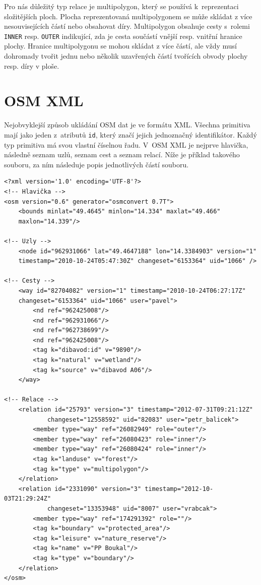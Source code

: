 Pro nás důležitý typ relace je {\tuc multipolygon}, který se používá k~reprezentaci
složitějších ploch. Plocha reprezentovaná multipolygonem se může skládat z více
nesouvisejících částí nebo obsahovat díry. Multipolygon obsahuje cesty s~rolemi 
\verb|INNER| resp. \verb|OUTER| indikující, zda je cesta součástí vnější resp.
vnitřní hranice plochy. Hranice multipolygonu se mohou skládat z více částí, ale
vždy musí dohromady tvořit jednu nebo několik uzavřených částí tvořících obvody 
plochy resp. díry v ploše.

\section{OSM XML}
Nejobvyklejší způsob ukládání OSM dat je ve formátu XML. Všechna primitiva mají
jako jeden z~atributů \verb|id|, který značí jejich jednoznačný identifikátor.
Každý typ primitiva má svou vlastní číselnou řadu. V~OSM XML \cite{osmxml} je
nejprve hlavička, následně seznam uzlů, seznam cest a seznam relací. Níže je
příklad takového souboru, za ním následuje popis jednotlivých částí souboru.

\begin{verbatim}
<?xml version='1.0' encoding='UTF-8'?>
<!-- Hlavička -->
<osm version="0.6" generator="osmconvert 0.7T">
	<bounds minlat="49.4645" minlon="14.334" maxlat="49.466" 
	maxlon="14.339"/>

<!-- Uzly -->
	<node id="962931066" lat="49.4647188" lon="14.3384903" version="1" 
	timestamp="2010-10-24T05:47:30Z" changeset="6153364" uid="1066" />

<!-- Cesty -->
	<way id="82704082" version="1" timestamp="2010-10-24T06:27:17Z" 
	changeset="6153364" uid="1066" user="pavel">
	    <nd ref="962425008"/>
	    <nd ref="962931066"/>
	    <nd ref="962738699"/>
	    <nd ref="962425008"/>
	    <tag k="dibavod:id" v="9890"/>
	    <tag k="natural" v="wetland"/>
	    <tag k="source" v="dibavod A06"/>
	</way>

<!-- Relace -->
	<relation id="25793" version="3" timestamp="2012-07-31T09:21:12Z" 
			changeset="12558592" uid="82083" user="petr_balicek">
	    <member type="way" ref="26082949" role="outer"/>
	    <member type="way" ref="26080423" role="inner"/>
	    <member type="way" ref="26080424" role="inner"/>
	    <tag k="landuse" v="forest"/>
	    <tag k="type" v="multipolygon"/>
	</relation>
	<relation id="2331090" version="3" timestamp="2012-10-03T21:29:24Z"
			changeset="13353948" uid="8007" user="vrabcak">
	    <member type="way" ref="174291392" role=""/>
	    <tag k="boundary" v="protected_area"/>
	    <tag k="leisure" v="nature_reserve"/>
	    <tag k="name" v="PP Boukal"/>
	    <tag k="type" v="boundary"/>
	</relation>
</osm>
\end{verbatim}

